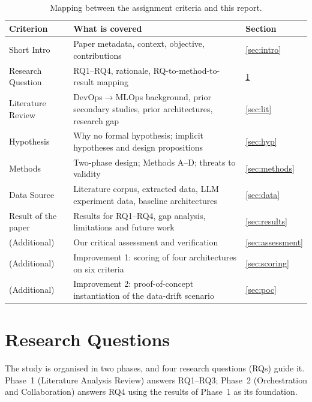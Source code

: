 \documentclass[11pt,a4paper]{article}
\begin{document}
\begin{table}[h]
\centering
\caption{Mapping between the assignment criteria and this report.}\label{tab:org}
\small
\begin{tabularx}{\textwidth}{@{}L{3.2cm}XL{1.4cm}@{}}
\toprule
Criterion & What is covered & Section \\
\midrule
Short Intro & Paper metadata, context, objective, contributions & \ref{sec:intro} \\
Research Question & RQ1--RQ4, rationale, RQ-to-method-to-result mapping & \ref{sec:rq} \\
Literature Review & DevOps$\rightarrow$MLOps background, prior secondary studies, prior architectures, research gap & \ref{sec:lit} \\
Hypothesis & Why no formal hypothesis; implicit hypotheses and design propositions & \ref{sec:hyp} \\
Methods & Two-phase design; Methods A--D; threats to validity & \ref{sec:methods} \\
Data Source & Literature corpus, extracted data, LLM experiment data, baseline architectures & \ref{sec:data} \\
Result of the paper & Results for RQ1--RQ4, gap analysis, limitations and future work & \ref{sec:results} \\
(Additional) & Our critical assessment and verification & \ref{sec:assessment} \\
(Additional) & Improvement 1: scoring of four architectures on six criteria & \ref{sec:scoring} \\
(Additional) & Improvement 2: proof-of-concept instantiation of the data-drift scenario & \ref{sec:poc} \\
\bottomrule
\end{tabularx}
\end{table}

\section{Research Questions}\label{sec:rq}

The study is organised in two phases, and four research questions (RQs) guide it. Phase~1 (Literature Analysis Review) answers RQ1--RQ3; Phase~2 (Orchestration and Collaboration) answers RQ4 using the results of Phase~1 as its foundation.
\end{document}
